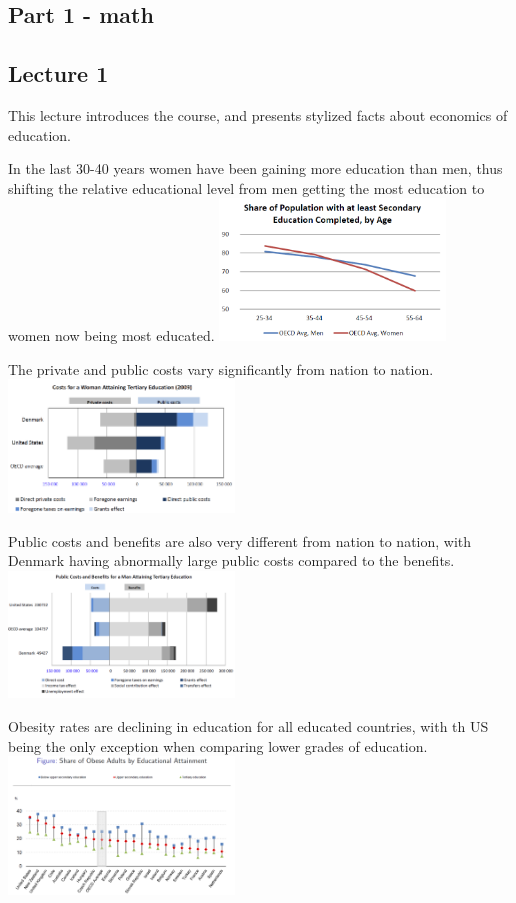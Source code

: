 \documentclass[12pt, a4paper]{article}
\begin{document}
\begin{multicols}{2}
\section{Part 1 - math}
\subsection{Lecture 1}
This lecture introduces the course, and presents stylized facts about economics of education.

In the last 30-40 years women have been gaining more education than men, thus shifting the relative educational level from men getting the most education to women now being most educated. 
\includegraphics[width = 0.45\textwidth]{MFrates.PNG}

The private and public costs vary significantly from nation to nation.
\includegraphics[width = 0.45\textwidth]{Capture.PNG}

Public costs and benefits are also very different from nation to nation, with Denmark having abnormally large public costs compared to the benefits. 
\includegraphics[width = 0.45\textwidth]{costben.PNG}

Obesity rates are declining in education for all educated countries, with th US being the only exception when comparing lower grades of education.
\includegraphics[width = 0.45\textwidth]{obese.PNG}


\end{multicols}
\end{document}

